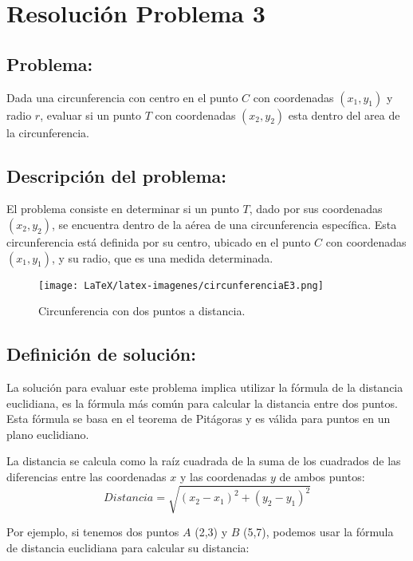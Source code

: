 \section{Resolución Problema 3}
\subsection{Problema:}
Dada una circunferencia con centro en el punto $C$ con coordenadas $(x_{1}, y_{1})$ y radio $r$, evaluar si un punto $T$ con coordenadas $(x_{2}, y_{2})$ esta dentro del area de la circunferencia.

\subsection{\textbf{Descripción del problema:}}

El problema consiste en determinar si un punto $T$, dado por sus coordenadas $(x_{2}, y_{2})$, se encuentra dentro de la aérea de una circunferencia específica. Esta circunferencia está definida por su centro, ubicado en el punto $C$ con coordenadas $(x_{1}, y_{1})$, y su radio, que es una medida determinada.

\begin{figure}[h!]
    \centering
    \texttt{[image: LaTeX/latex-imagenes/circunferenciaE3.png]}
    \caption{Circunferencia con dos puntos a distancia.}
    \label{fig:uno}
\end{figure}


\subsection{\textbf{Definición de solución:}}

La solución para evaluar este problema implica utilizar la fórmula de la distancia euclidiana, es la fórmula más común para calcular la distancia entre dos puntos. Esta fórmula se basa en el teorema de Pitágoras y es válida para puntos en un plano euclidiano.

La distancia se calcula como la raíz cuadrada de la suma de los cuadrados de las diferencias entre las coordenadas $x$ y las coordenadas $y$ de ambos puntos:
\begin{equation}
Distancia = 
   \sqrt{ (x_2 - x_1)^2 + (y_2 - y_1)^2 }     
\end{equation}

\par Por ejemplo, si tenemos dos puntos $A$ (2,3) y $B$ (5,7), podemos usar la fórmula de distancia euclidiana para calcular su distancia:\\

